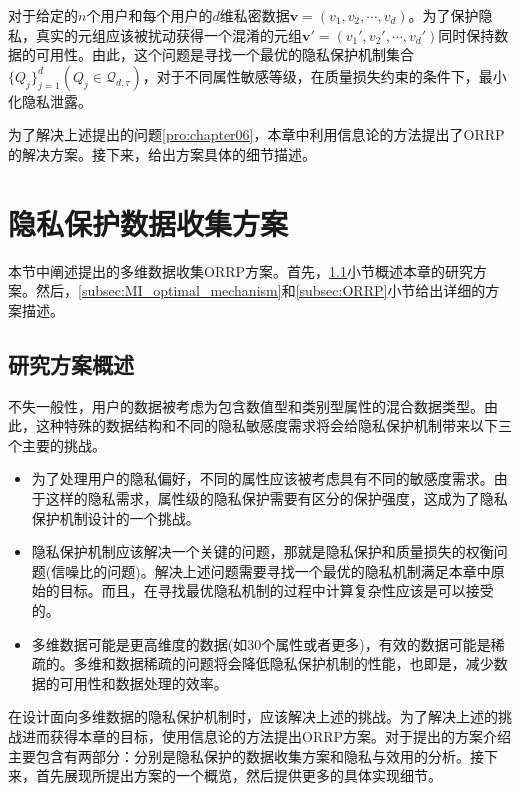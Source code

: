\begin{problem}\label{pro:chapter06}
对于给定的$n$个用户和每个用户的$d$维私密数据$\bm{v}=(v_1,v_2,\cdots,v_d)$。为了保护隐私，真实的元组应该被扰动获得一个混淆的元组$\bm{v}'=(v_1',v_2',\cdots,v_d')$同时保持数据的可用性。由此，这个问题是寻找一个最优的隐私保护机制集合$\{Q_j\}_{j=1}^d(Q_j \in \mathcal{Q}_{d,\tau})$，对于不同属性敏感等级，在质量损失约束的条件下，最小化隐私泄露。
\end{problem}

为了解决上述提出的问题\ref{pro:chapter06}，本章中利用信息论的方法提出了ORRP的解决方案。接下来，给出方案具体的细节描述。

\section{隐私保护数据收集方案}\label{sec:chapter06_our_scheme}

本节中阐述提出的多维数据收集ORRP方案。首先，\ref{subsec:our_idea}小节概述本章的研究方案。然后，\ref{subsec:MI_optimal_mechanism}和\ref{subsec:ORRP}小节给出详细的方案描述。

 \subsection{研究方案概述}\label{subsec:our_idea}

不失一般性，用户的数据被考虑为包含数值型和类别型属性的混合数据类型。由此，这种特殊的数据结构和不同的隐私敏感度需求将会给隐私保护机制带来以下三个主要的挑战。

\begin{itemize}
\item 为了处理用户的隐私偏好，不同的属性应该被考虑具有不同的敏感度需求。由于这样的隐私需求，属性级的隐私保护需要有区分的保护强度，这成为了隐私保护机制设计的一个挑战。

\item 隐私保护机制应该解决一个关键的问题，那就是隐私保护和质量损失的权衡问题(信噪比的问题\cite{zhang2014privbayes})。解决上述问题需要寻找一个最优的隐私机制满足本章中原始的目标。而且，在寻找最优隐私机制的过程中计算复杂性应该是可以接受的。

\item 多维数据可能是更高维度的数据(如$30$个属性或者更多)，有效的数据可能是稀疏的。多维和数据稀疏的问题将会降低隐私保护机制的性能，也即是，减少数据的可用性和数据处理的效率。
\end{itemize}

在设计面向多维数据的隐私保护机制时，应该解决上述的挑战。为了解决上述的挑战进而获得本章的目标，使用信息论的方法提出ORRP方案。对于提出的方案介绍主要包含有两部分：分别是隐私保护的数据收集方案和隐私与效用的分析。接下来，首先展现所提出方案的一个概览，然后提供更多的具体实现细节。


